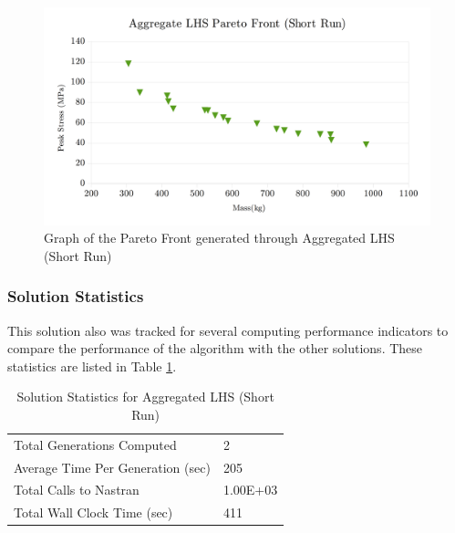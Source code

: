 \begin{figure}[!htbp]
\includegraphics[width=\textwidth]{img/pf_agg_short.png}
\caption{Graph of the Pareto Front generated through Aggregated LHS (Short Run)}
\label{fig:pfront_agg_short}
\end{figure}

\subsubsection{Solution Statistics}
This solution also was tracked for several computing performance indicators to compare the performance of the algorithm with the other solutions. These statistics are listed in Table \ref{tab:stat_agg_short}. 

\begin{table}[!htbp]
\caption{Solution Statistics for Aggregated LHS (Short Run)}
  \label{tab:stat_agg_short}
  \centering
  \begin{tabular}{|l|l|}
    \hline
	  Total Generations Computed & 2\\
    Average Time Per Generation (sec) & 205\\
    Total Calls to Nastran & 1.00E+03\\
    Total Wall Clock Time (sec)	 & 411\\
    \hline
  \end{tabular}
\end{table}

